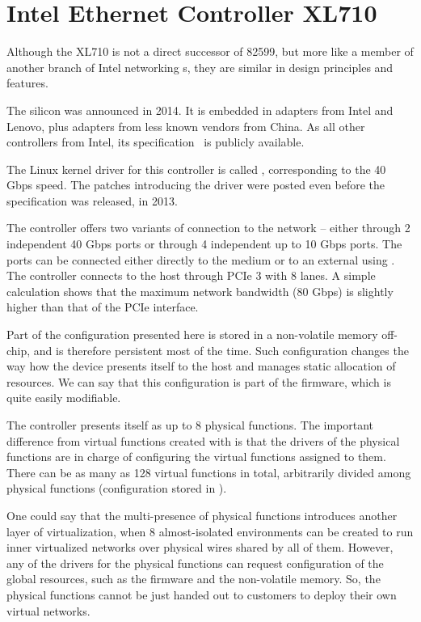 \section{Intel Ethernet Controller XL710}
\label{nic:xl710}
\renewcommand{\sect}[1]{\cite[#1]{XL710}}


Although the XL710 is not a direct successor of 82599, but more like a member
of another branch of Intel networking s, they are similar in design
principles and features.

The silicon was announced in 2014. It is embedded in adapters from Intel and
Lenovo, plus adapters from less known vendors from China. As all other controllers from
Intel, its specification~\cite{XL710} is publicly available.

The Linux kernel driver for this controller is called , corresponding
to the 40 Gbps speed. The patches introducing the driver were posted even
before the specification was released, in 2013.

The controller offers two variants of connection to the network -- either
through 2 independent 40 Gbps ports or through 4 independent up to 10 Gbps
ports. The ports can be connected either directly to the medium or to an
external  using . The controller connects to the host through
PCIe 3 with 8 lanes. A simple calculation shows that the maximum network
bandwidth (80 Gbps) is slightly higher than that of the PCIe interface.

Part of the configuration presented here is stored in a non-volatile memory
off-chip, and is therefore persistent most of the time. Such configuration
changes the way how the device presents itself to the host and manages static
allocation of resources. We can say that this configuration is part of the
firmware, which is quite easily modifiable.

The controller presents itself as up to 8 physical functions. The important
difference from virtual functions created with  is that the drivers
of the physical functions are in charge of configuring the virtual functions
assigned to them. There can be as many as 128 virtual functions in total,
arbitrarily divided among physical functions (configuration stored in ).

One could say that the multi-presence of physical functions introduces another
layer of virtualization, when 8 almost-isolated environments can be created to
run inner virtualized networks over physical wires shared by all of them.
However, any of the drivers for the physical functions can request
configuration of the global resources, such as the firmware and the
non-volatile memory. So, the physical functions cannot be just handed out to
customers to deploy their own virtual networks.

